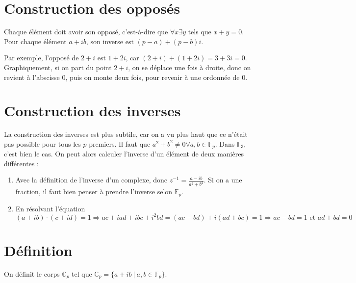 \documentclass[10pt,a4paper]{book}
\newcommand{\F}{\mathbb{F}}
\newcommand{\C}{\mathbb{C}}
\begin{document}
\section{Construction des opposés}
Chaque élément doit avoir son opposé, c'est-à-dire que $\forall x\exists y$ tels que $x+y=0$. Pour chaque élément $a+ib$, son inverse est $(p-a)+(p-b)i$. \par 
Par exemple, l'opposé de $2+i$ est $1+2i$, car $(2+i)+(1+2i)=3+3i=0$. Graphiquement, si on part du point $2+i$, on se déplace une fois à droite, donc on revient à l'abscisse 0, puis on monte deux fois, pour revenir à une ordonnée de 0.

\section{Construction des inverses}
La construction des inverses est plus subtile, car on a vu plus haut que ce n'était pas possible pour tous les $p$ premiers. Il faut que $a^2+b^2\neq0\forall a,b\in\F_p$. Dans $\F_3$, c'est bien le cas. On peut alors calculer l'inverse d'un élément de deux manières différentes :
\begin{enumerate}
\item Avec la définition de l'inverse d'un complexe, donc $z^{-1}=\frac{a-ib}{a^2+b^2}$. Si on a une fraction, il faut bien penser à prendre l'inverse selon $\F_p$.
\item En résolvant l'équation $(a+ib)\cdot(c+id)=1\Rightarrow ac+iad+ibc+i^2bd=(ac-bd)+i(ad+bc)=1\Rightarrow ac-bd=1\text{ et }ad+bd=0$
\end{enumerate}

\section{Définition}
On définit le corps $\C_p$ tel que $\C_p = \{a+ib\ |\ a,b\in\F_p\}$. 
\end{document}
